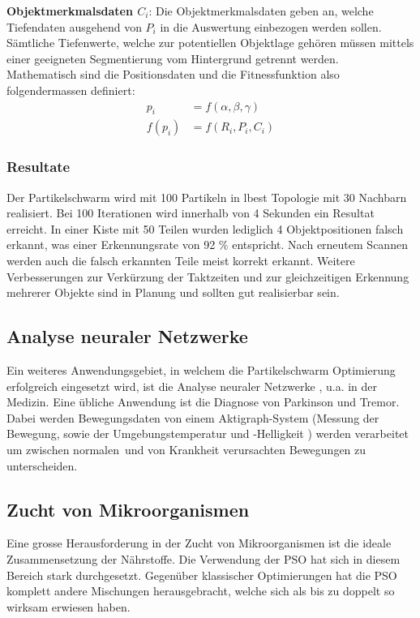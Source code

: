 \textbf{Objektmerkmalsdaten $C_i$}: Die Objektmerkmalsdaten geben an, welche Tiefendaten ausgehend von $P_i$ in die Auswertung einbezogen werden sollen. Sämtliche Tiefenwerte, welche zur potentiellen Objektlage gehören müssen mittels einer geeigneten Segmentierung vom Hintergrund getrennt werden. \\

Mathematisch sind die Positionsdaten und die Fitnessfunktion also folgendermassen definiert: 
\begin{align}
	p_i &= f(\alpha ,\beta ,\gamma) \\
	f(p_i) &= f(R_i,P_i,C_i)
\end{align}

\subsubsection{Resultate}
Der Partikelschwarm wird mit 100 Partikeln in lbest Topologie mit 30 Nachbarn realisiert. Bei 100 Iterationen wird innerhalb von 4 Sekunden ein Resultat erreicht. In einer Kiste mit 50 Teilen wurden lediglich 4 Objektpositionen falsch erkannt, was einer Erkennungsrate von 92 \% entspricht. Nach erneutem Scannen werden auch die falsch erkannten Teile meist korrekt erkannt. Weitere Verbesserungen zur Verkürzung der Taktzeiten und zur gleichzeitigen Erkennung  mehrerer Objekte sind in Planung und sollten gut realisierbar sein.

\subsection{Analyse neuraler Netzwerke}
Ein weiteres Anwendungsgebiet, in welchem die Partikelschwarm Optimierung erfolgreich eingesetzt wird, ist die Analyse neuraler Netzwerke , u.a. in der Medizin. Eine übliche Anwendung ist die Diagnose von Parkinson und Tremor. Dabei werden Bewegungsdaten von einem Aktigraph-System (Messung der Bewegung, sowie der Umgebungstemperatur und -Helligkeit ) werden verarbeitet um zwischen \textacutedbl normalen\textacutedbl \ und von Krankheit verursachten Bewegungen zu unterscheiden. \cite{Shi-Appl}

\subsection{Zucht von Mikroorganismen}
Eine grosse Herausforderung in der Zucht von Mikroorganismen ist die ideale Zusammensetzung der Nährstoffe. Die Verwendung der PSO hat sich in diesem Bereich stark durchgesetzt. Gegenüber klassischer Optimierungen hat die PSO komplett andere Mischungen herausgebracht, welche sich als bis zu doppelt so wirksam erwiesen haben. \cite{Shi-Appl}